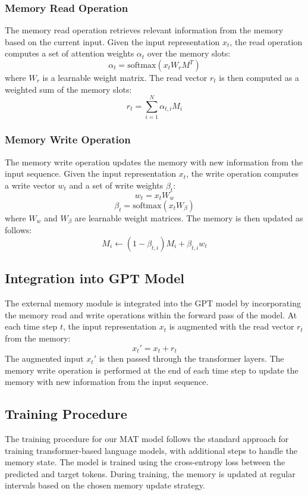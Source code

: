 \documentclass{article} %
\begin{document}
\subsubsection{Memory Read Operation}
The memory read operation retrieves relevant information from the memory based on the current input. Given the input representation \( x_t \), the read operation computes a set of attention weights \( \alpha_t \) over the memory slots:
\[
\alpha_t = \text{softmax}(x_t W_r M^T)
\]
where \( W_r \) is a learnable weight matrix. The read vector \( r_t \) is then computed as a weighted sum of the memory slots:
\[
r_t = \sum_{i=1}^{N} \alpha_{t,i} M_i
\]

\subsubsection{Memory Write Operation}
The memory write operation updates the memory with new information from the input sequence. Given the input representation \( x_t \), the write operation computes a write vector \( w_t \) and a set of write weights \( \beta_t \):
\[
w_t = x_t W_w
\]
\[
\beta_t = \text{softmax}(x_t W_\beta)
\]
where \( W_w \) and \( W_\beta \) are learnable weight matrices. The memory is then updated as follows:
\[
M_i \leftarrow (1 - \beta_{t,i}) M_i + \beta_{t,i} w_t
\]

\subsection{Integration into GPT Model}
The external memory module is integrated into the GPT model by incorporating the memory read and write operations within the forward pass of the model. At each time step \( t \), the input representation \( x_t \) is augmented with the read vector \( r_t \) from the memory:
\[
x_t' = x_t + r_t
\]
The augmented input \( x_t' \) is then passed through the transformer layers. The memory write operation is performed at the end of each time step to update the memory with new information from the input sequence.

\subsection{Training Procedure}
The training procedure for our MAT model follows the standard approach for training transformer-based language models, with additional steps to handle the memory state. The model is trained using the cross-entropy loss between the predicted and target tokens. During training, the memory is updated at regular intervals based on the chosen memory update strategy.
\end{document}
